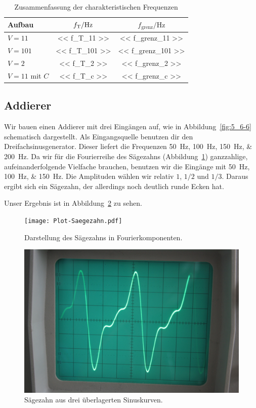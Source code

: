 \begin{table}[htbp]
	\centering
	\begin{tabular}{lSS}
		{Aufbau} &
		{$\fT / \si\hertz$} &
		{$f_\text{grenz} / \si\hertz$} \\
		\hline
		$V = 11$ & << f_T_11 >> & << f_grenz_11 >> \\
		$V = 101$ & << f_T_101 >> & << f_grenz_101 >> \\
		$V = 2$ & << f_T_2 >> & << f_grenz_2 >> \\
		$V = 11$ mit $C$ & << f_T_c >> & << f_grenz_c >> \\
	\end{tabular}
	\caption{%
		Zusammenfassung der charakteristischen Frequenzen
	}
	\label{tab:Verstaerker-Zusammenfassung}
\end{table}

\FloatBarrier
\subsection{Addierer}

Wir bauen einen Addierer mit drei Eingängen auf, wie in
Abbildung~\ref{fig:5_6-6} schematisch dargestellt. Als Eingangsquelle benutzen
dir den Dreifachsinusgenerator. Dieser liefert die Frequenzen
\SIlist{50;100;150;200}{\hertz}. Da wir für die Fourierreihe des Sägezahns
(Abbildung~\ref{fig:saegezahn}) ganzzahlige, aufeinanderfolgende Vielfache
brauchen, benutzen wir die Eingänge mit \SIlist{50;100;150}{\hertz}. Die
Amplituden wählen wir relativ $1$, $1/2$ und $1/3$. Daraus ergibt sich ein
Sägezahn, der allerdings noch deutlich runde Ecken hat.

Unser Ergebnis ist in Abbildung~\ref{fig:811} zu sehen.

\begin{figure}[htbp]
	\centering
	\texttt{[image: Plot-Saegezahn.pdf]}
	\caption{%
		Darstellung des Sägezahns in Fourierkomponenten.
	}
	\label{fig:saegezahn}
\end{figure}

\begin{figure}[htbp]
	\centering
	\includegraphics[width=.45\linewidth]{Oszi_Foto/5-811.jpg}
	\caption{%
        Sägezahn aus drei überlagerten Sinuskurven.
	}
	\label{fig:811}
\end{figure}

